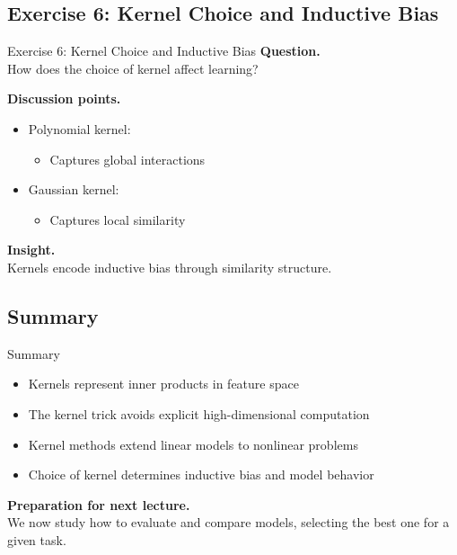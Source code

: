 \documentclass[aspectratio=169,11pt]{beamer}
\begin{document}
\subsection{Exercise 6: Kernel Choice and Inductive Bias}
\begin{frame}[t,allowframebreaks]{Exercise 6: Kernel Choice and Inductive Bias}
\small
\textbf{Question.}\\ How does the choice of kernel affect learning?

\textbf{Discussion points.}\\ \begin{itemize}
    \item Polynomial kernel:
    \begin{itemize}
        \item Captures global interactions
    \end{itemize}

    \item Gaussian kernel:
    \begin{itemize}
        \item Captures local similarity
    \end{itemize}
\end{itemize}

\textbf{Insight.}\\ Kernels encode inductive bias through similarity structure.
\end{frame}

\subsection{Summary}
\begin{frame}[t,allowframebreaks]{Summary}
\small
\begin{itemize}
    \item Kernels represent inner products in feature space
    \item The kernel trick avoids explicit high-dimensional computation
    \item Kernel methods extend linear models to nonlinear problems
    \item Choice of kernel determines inductive bias and model behavior
\end{itemize}

\textbf{Preparation for next lecture.}\\ We now study how to evaluate and compare models, selecting the best one for a given task.
\end{frame}
\end{document}
